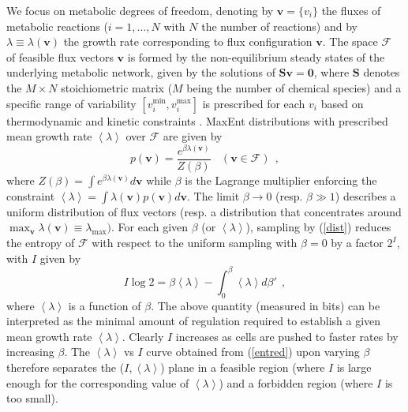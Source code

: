 \documentclass[superscriptaddress,amsmath,amssymb,twocolumn]{revtex4-1}
\newcommand{\avg}[1]{\left\langle #1 \right\rangle}
\begin{document}
We focus on metabolic degrees of freedom, denoting by $\mathbf{v}=\{v_i\}$ the fluxes of metabolic reactions ($i=1,\ldots,N$ with $N$ the number of reactions) and by $\lambda\equiv\lambda(\mathbf{v})$ the growth rate corresponding to flux configuration $\mathbf{v}$. The space $\mathcal{F}$ of feasible flux vectors $\mathbf{v}$ is formed by the non-equilibrium steady states of the underlying metabolic network, given by the solutions of $\mathbf{Sv=0}$, where $\mathbf{S}$ denotes the $M\times N$ stoichiometric matrix ($M$ being the number of chemical species) and a specific range of variability $[v_i^{\min},v_i^{\max}]$ is prescribed for each $v_i$ based on thermodynamic and kinetic constraints \cite{what}. MaxEnt distributions with prescribed mean growth rate $\avg{\lambda}$ over $\mathcal{F}$ are given by \cite{physbio}
\begin{equation} \label{dist}
p(\mathbf{v})=\frac{e^{\beta\lambda(\mathbf{v})}}{Z(\beta)}~~~~(\mathbf{v}\in\mathcal{F})~~,
\end{equation} 
where $Z(\beta)=\int e^{\beta\lambda(\mathbf{v})}d\mathbf{v}$ while $\beta$ is the Lagrange multiplier enforcing the constraint $\avg{\lambda}=\int\lambda(\mathbf{v})p(\mathbf{v})d\mathbf{v}$. The limit $\beta\to 0$ (resp. $\beta\gg 1$) describes a uniform distribution of flux vectors (resp. a distribution that concentrates around $\max_\mathbf{v}\lambda(\mathbf{v})\equiv\lambda_{\max})$. For each given $\beta$ (or $\avg{\lambda}$), sampling by (\ref{dist}) reduces the entropy of $\mathcal{F}$ with respect to the uniform sampling with $\beta=0$ by a factor $2^I$, with $I$ given by \cite{physbio}
\begin{equation}\label{entred}
I\log 2=\beta\avg{\lambda}-\int_0^\beta \avg{\lambda}d\beta'~~,
\end{equation}
where $\avg{\lambda}$ is a function of $\beta$. The above quantity (measured in bits) can be interpreted as the minimal  amount of regulation required to establish a given mean growth rate $\avg{\lambda}$. Clearly $I$ increases as cells are pushed to faster rates by increasing $\beta$. The $\avg{\lambda}$ vs $I$ curve obtained from (\ref{entred}) upon varying $\beta$ therefore separates the ($I,\avg{\lambda}$) plane in a feasible region (where $I$ is large enough for the corresponding value of $\avg{\lambda}$) and a forbidden region (where $I$ is too small). 
\end{document}
